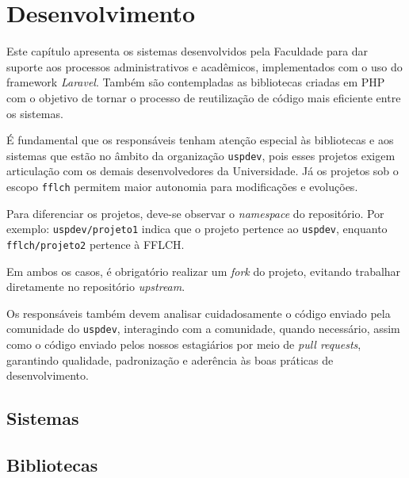 \chapter{Desenvolvimento}

Este capítulo apresenta os sistemas desenvolvidos pela Faculdade para dar suporte aos processos administrativos e acadêmicos, implementados com o uso do framework \textit{Laravel}. Também são contempladas as bibliotecas criadas em PHP com o objetivo de tornar o processo de reutilização de código mais eficiente entre os sistemas.

É fundamental que os responsáveis tenham atenção especial às bibliotecas e aos sistemas que estão no âmbito da organização \texttt{uspdev}, pois esses projetos exigem articulação com os demais desenvolvedores da Universidade. Já os projetos sob o escopo \texttt{fflch} permitem maior autonomia para modificações e evoluções.

Para diferenciar os projetos, deve-se observar o \textit{namespace} do repositório. Por exemplo: \texttt{uspdev/projeto1} indica que o projeto pertence ao \texttt{uspdev}, enquanto \texttt{fflch/projeto2} pertence à FFLCH.

Em ambos os casos, é obrigatório realizar um \textit{fork} do projeto, evitando trabalhar diretamente no repositório \textit{upstream}.

Os responsáveis também devem analisar cuidadosamente o código enviado pela comunidade do \texttt{uspdev}, interagindo com a comunidade, quando necessário, assim como o código enviado pelos nossos estagiários por meio de \textit{pull requests}, garantindo qualidade, padronização e aderência às boas práticas de desenvolvimento.

\section{Sistemas}

\newpage
\section{Bibliotecas}

